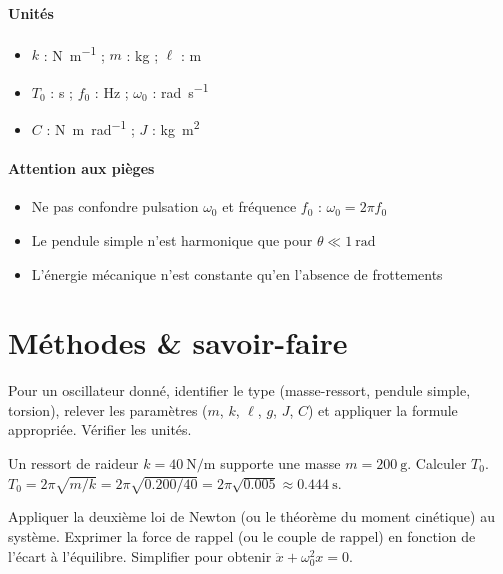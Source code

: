 \begin{synthese}
\paragraph{Unités}
\begin{itemize}
    \item $k$ : \si{\newton\per\metre} ; $m$ : \si{\kilogram} ; $\ell$ : \si{\metre}
    \item $T_0$ : \si{\second} ; $f_0$ : \si{\hertz} ; $\omega_0$ : \si{\radian\per\second}
    \item $C$ : \si{\newton\metre\per\radian} ; $J$ : \si{\kilogram\metre\squared}
\end{itemize}

\paragraph{Attention aux pièges}
\begin{itemize}
    \item Ne pas confondre pulsation $\omega_0$ et fréquence $f_0$ : $\omega_0 = 2\pi f_0$
    \item Le pendule simple n'est harmonique que pour $\theta \ll \SI{1}{\radian}$
    \item L'énergie mécanique n'est constante qu'en l'absence de frottements
\end{itemize}
\end{synthese}

\section{Méthodes \& savoir-faire}

Pour un oscillateur donné, identifier le type (masse-ressort, pendule simple, torsion), relever les paramètres ($m$, $k$, $\ell$, $g$, $J$, $C$) et appliquer la formule appropriée. Vérifier les unités.

\begin{exemple}
Un ressort de raideur $k = \SI{40}{\newton\per\metre}$ supporte une masse $m = \SI{200}{\gram}$. Calculer $T_0$.
$T_0 = 2\pi\sqrt{m/k} = 2\pi\sqrt{0.200/40} = 2\pi\sqrt{0.005} \approx \SI{0.444}{\second}$.
\end{exemple}

Appliquer la deuxième loi de Newton (ou le théorème du moment cinétique) au système. Exprimer la force de rappel (ou le couple de rappel) en fonction de l'écart à l'équilibre. Simplifier pour obtenir $\ddot{x} + \omega_0^2 x = 0$.

